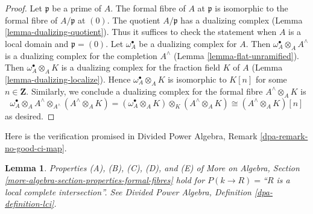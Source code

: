 \documentclass{stacks-project}
\theoremstyle{plain}
\newtheorem{lemma}[subsection]{Lemma}
\theoremstyle{definition}
\theoremstyle{remark}
\numberwithin{equation}{subsection}
\begin{document}
\begin{proof}
Let $\mathfrak p$ be a prime of $A$. The formal fibre of $A$ at $\mathfrak p$
is isomorphic to the formal fibre of $A/\mathfrak p$ at $(0)$. The quotient
$A/\mathfrak p$ has a dualizing complex
(Lemma \ref{lemma-dualizing-quotient}).
Thus it suffices to check the statement
when $A$ is a local domain and $\mathfrak p = (0)$.
Let $\omega_A^\bullet$ be a dualizing complex for $A$. Then
$\omega_A^\bullet \otimes_A A^\wedge$ is a dualizing complex
for the completion $A^\wedge$
(Lemma \ref{lemma-flat-unramified}).
Then $\omega_A^\bullet \otimes_A K$ is a dualizing
complex for the fraction field $K$ of $A$
(Lemma \ref{lemma-dualizing-localize}).
Hence $\omega_A^\bullet \otimes_A K$
is isomorphic to $K[n]$ for some $n \in \mathbf{Z}$.
Similarly, we conclude a dualizing complex for the formal fibre
$A^\wedge \otimes_A K$ is
$$
\omega_A^\bullet \otimes_A A^\wedge \otimes_{A^\wedge} (A^\wedge \otimes_A K) =
(\omega_A^\bullet \otimes_A K) \otimes_K (A^\wedge \otimes_A K) \cong
(A^\wedge \otimes_A K)[n]
$$
as desired.
\end{proof}

\noindent
Here is the verification promised in
Divided Power Algebra, Remark \ref{dpa-remark-no-good-ci-map}.

\begin{lemma}
\label{lemma-formal-fibres-lci}
Properties (A), (B), (C), (D), and (E) of
More on Algebra, Section \ref{more-algebra-section-properties-formal-fibres}
hold for $P(k \to R) =$``$R$ is a local complete intersection''.
See Divided Power Algebra, Definition \ref{dpa-definition-lci}.
\end{lemma}
\end{document}
